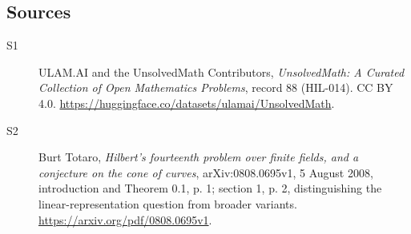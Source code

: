 \documentclass[11pt]{article}
\begin{document}
\subsection{Sources}
\begin{description}
\item[\hypertarget{source:88:1}{S1}] ULAM.AI and the UnsolvedMath Contributors, \emph{UnsolvedMath: A Curated Collection of Open Mathematics Problems}, record 88 (HIL-014). CC BY 4.0. \url{https://huggingface.co/datasets/ulamai/UnsolvedMath}.
\item[\hypertarget{source:88:2}{S2}] Burt Totaro, \emph{Hilbert's fourteenth problem over finite fields, and a conjecture on the cone of curves}, arXiv:0808.0695v1, 5 August 2008, introduction and Theorem 0.1, p. 1; section 1, p. 2, distinguishing the linear-representation question from broader variants. \url{https://arxiv.org/pdf/0808.0695v1}.
\end{description}
\label{end:88}
\end{document}
